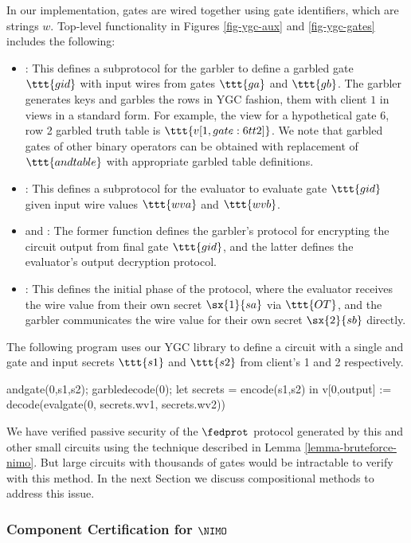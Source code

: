 In our implementation, gates are wired together using gate
identifiers, which are strings $w$. Top-level functionality in Figures
\ref{fig-ygc-aux} and \ref{fig-ygc-gates} includes the following:
\begin{itemize}
\item {}: This defines a subprotocol for the garbler
  to define a garbled gate $\ttt{gid}$ with input wires from gates
  $\ttt{ga}$ and $\ttt{gb}$. The garbler generates keys and garbles
  the rows in YGC fashion, them with client $1$ in
  views in a standard form. For example, the view for
  a hypothetical gate 6, row 2 garbled truth table is $\ttt{v[1,gate:6tt2]}$.
  We note that garbled gates of other binary operators can be obtained with
  replacement of $\ttt{andtable}$ with appropriate garbled table definitions. 
\item {}: This defines a subprotocol for the evaluator to
  evaluate gate $\ttt{gid}$ given input wire values $\ttt{wva}$ and
  $\ttt{wvb}$.
\item {} and : The former function
  defines the garbler's protocol for encrypting the circuit
  output from final gate $\ttt{gid}$, and the latter defines
  the evaluator's output decryption protocol.
\item {}: This defines the initial phase of the protocol,
  where the evaluator receives the wire value from their own
  secret $\sx{1}{sa}$ via $\ttt{OT}$, and the garbler communicates
  the wire value for their own secret $\sx{2}{sb}$ directly.
\end{itemize}
\begin{example}
  \label{example-andcircuit}
The following program uses our YGC library to define
a circuit with a single and gate and input secrets $\ttt{s1}$ and
$\ttt{s2}$ from client's 1 and 2 respectively. 
\begin{verbatimtab}
  andgate(0,s1,s2);
  garbledecode(0);
  let secrets = encode(s1,s2) in
  v[0,output] := decode(evalgate(0, secrets.wv1, secrets.wv2))
\end{verbatimtab}
\end{example}
We have verified passive security of the $\fedprot$ protocol
generated by this and other small circuits using the
technique described in Lemma \ref{lemma-bruteforce-nimo}.
But large circuits with thousands of gates would be
intractable to verify with this method. In the next Section
we discuss compositional methods to address this issue.

\subsubsection{Component Certification for $\NIMO$}
\label{section-composition-certification}

